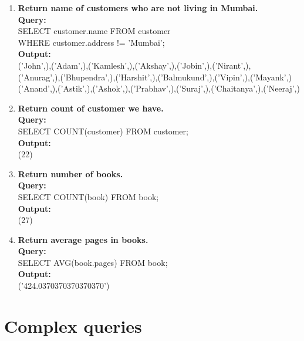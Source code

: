 \begin{enumerate}
\item \textbf{Return name of customers who are not living in Mumbai.}\\
\textbf{Query:}\\
SELECT customer.name FROM customer\\
WHERE customer.address != 'Mumbai';\\
\textbf{Output:}\\
('John',),('Adam',),('Kamlesh',),('Akshay',),('Jobin',),('Nirant',),\\
('Anurag',),('Bhupendra',),('Harshit',),('Balmukund',),('Vipin',),('Mayank',)\\
('Anand',),('Astik',),('Ashok',),('Prabhav',),('Suraj',),('Chaitanya',),('Neeraj',)\\

\item \textbf{Return count of customer we have.}\\
\textbf{Query:}\\SELECT COUNT(customer) FROM customer;\\
\textbf{Output:}\\ (22)

\item \textbf{Return number of books.}\\
\textbf{Query:}\\SELECT COUNT(book) FROM book;\\
\textbf{Output:}\\ (27)

\item \textbf{Return average pages in books.}\\
\textbf{Query:}\\SELECT AVG(book.pages) FROM book;\\
\textbf{Output:}\\ ('424.0370370370370370')

\end{enumerate}

\section{Complex queries}

